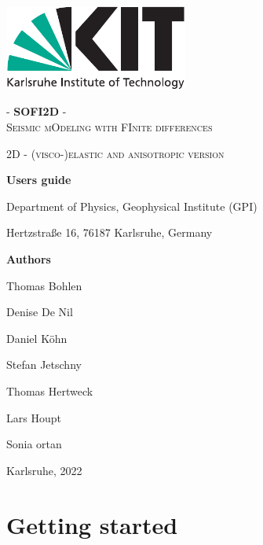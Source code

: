 \documentclass[11pt,english,a4paper]{article}
\begin{document}
\pagecolor{lightgray}\afterpage{\nopagecolor}
\begin{titlepage}
       	\centering
        {\includegraphics[height=2.8cm]{figures/kitlogo_en_cmyk}}
    
	\vspace{2cm}
	
	\textsc{\Huge - \textbf{SOFI2D} -\\ Seismic mOdeling with FInite differences\\}
	
	\vspace{1cm}
	
	\textsc{\huge 2D - (visco-)elastic and anisotropic version}
	
	\vspace{1cm}
	
	{\large \textbf{Users guide}\par}
	\vspace{1cm}
 	Department of Physics, Geophysical Institute (GPI)\par
	Hertzstra\ss{}e 16, 76187 Karlsruhe, Germany\par
	\vspace{1.5cm}
	{\large \textbf{Authors}\par} 
	Thomas Bohlen\par
	Denise De Nil \par
	Daniel K\"ohn \par
	Stefan Jetschny \par
    Thomas Hertweck \par 
    Lars Houpt \par 
    Sonia ortan\par
    \vspace{1cm}
    {\large Karlsruhe, 2022\par}
\end{titlepage}

\thispagestyle{empty}
\cleardoublepage

\tableofcontents
\newpage

\section{Getting started}
\end{document}
